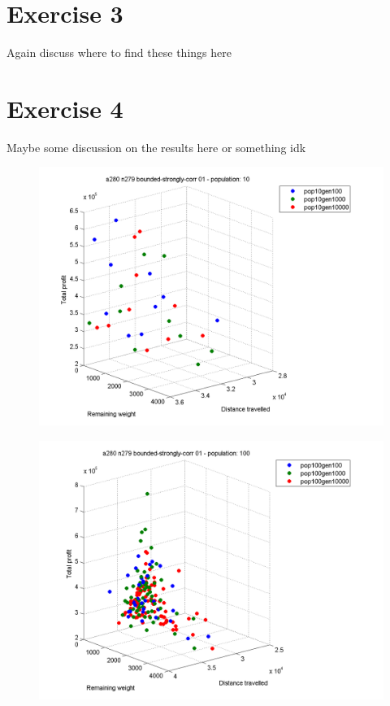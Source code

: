 \documentclass[a4paper,12pt]{article}
\begin{document}
\section*{Exercise 3}
Again discuss where to find these things here

\section*{Exercise 4}
Maybe some discussion on the results here or something idk



\begin{figure}[h]
\centering
\begin{minipage}{.5\textwidth}
  \centering
  \includegraphics[width=.8\linewidth]{q4graphs/a280_n279_pop10.png}
  \label{fig:a28027910}
\end{minipage}%
\begin{minipage}{.5\textwidth}
  \centering
  \includegraphics[width=.8\linewidth]{q4graphs/a280_n279_pop100.png}
  \label{fig:a280279100}
\end{minipage}
\end{figure}
\end{document}
